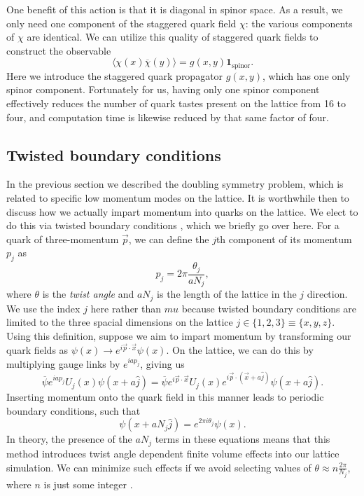 One benefit of this action is that it is diagonal in spinor space. As a result, we only need one component of the staggered quark field $\chi$: the various components of $\chi$ are identical.  %
We can utilize this quality of staggered quark fields to construct the observable
\begin{equation}\label{eq:HISQ_quark_propagator}
    \langle\chi(x)\overline{\chi}(y)\rangle = g(x,y)\textbf{1}_\mathrm{spinor}.
\end{equation}
Here we introduce the staggered quark propagator $g(x,y)$, which has one only spinor component. Fortunately for us, having only one spinor component effectively reduces the number of quark tastes present on the lattice from 16 to four, and computation time is likewise reduced by that same factor of four.


\subsection{Twisted boundary conditions} \label{sec:twisted_boundary_conditions}
In the previous section we described the doubling symmetry problem, which is related to specific low momentum modes on the lattice. It is worthwhile then to discuss how we actually impart momentum into quarks on the lattice.  We elect to do this via twisted boundary conditions \cite{SACHRAJDA200573, Bedaque_2004, DEDIVITIIS2004408, Guadagnoli_2006}, which we briefly go over here.  For a quark of three-momentum $\vec{p}$, we can define the $j$th component of its momentum $p_j$ as 
\begin{equation}\label{eq:twist_def}
    p_j = 2\pi\frac{\theta_j}{aN_j},
\end{equation}
where $\theta$ is the \textit{twist angle} and $aN_j$ is the length of the lattice in the $j$ direction.  We use the index $j$ here rather than $mu$ because twisted boundary conditions are limited to the three spacial dimensions on the lattice $j\in\{1,2,3\}\equiv\{x,y,z\}$. Using this definition, suppose we aim to impart momentum by transforming our quark fields as $\psi(x) \rightarrow e^{i\vec{p}\cdot \vec{x}} \psi(x)$.  On the lattice, we can do this by multiplying gauge links by $e^{iap_j}$, giving us
\begin{equation}\label{eq:gauge_link_multiply}
    \overline\psi e^{iap_j} U_j(x) \psi(x+a\hat j) = 
    \overline{\psi}e^{i\vec{p}\cdot \vec{x}}U_j(x)e^{i\vec{p}\cdot (\vec{x}+a\hat j)}\psi(x+a\hat j).
\end{equation}
Inserting momentum onto the quark field in this manner leads to periodic boundary conditions, such that
\begin{equation}\label{eq:periodic_boundary}
    \psi(x + aN_j \hat j) = e^{2\pi i\theta_j}\psi(x).
\end{equation}
In theory, the presence of the $aN_j$ terms in these equations means that this method introduces twist angle dependent finite volume effects into our lattice simulation.  We can minimize such effects if we avoid selecting values of $\theta \approx n\frac{2\pi}{N_j}$, where $n$ is just some integer \cite{FLYNN2006313}.


